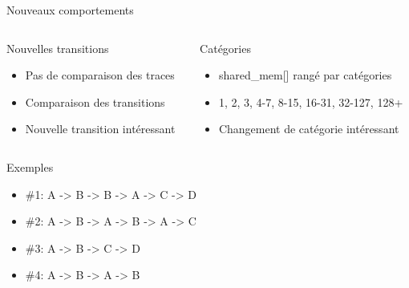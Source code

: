 \begin{frame}{Nouveaux comportements}
  \begin{columns}
    \begin{column}{0.5\textwidth}
      \begin{exampleblock}{Nouvelles transitions}
        \begin{itemize}
          \item{Pas de comparaison des traces}
          \item{Comparaison des transitions}
          \item{Nouvelle transition intéressant}
        \end{itemize}
      \end{exampleblock}
    \end{column}

    \begin{column}{0.5\textwidth}
      \begin{exampleblock}{Catégories}
        \begin{itemize}
          \item{shared\_mem[] rangé par catégories}
          \item{1, 2, 3, 4-7, 8-15, 16-31, 32-127, 128+} 
          \item{Changement de catégorie intéressant}
        \end{itemize}
      \end{exampleblock}
    \end{column}
  \end{columns}

  \pause
  \hspace{50.5cm}

  {\Large \centerline{Exemples}}

  \hspace{20.5cm}

  \begin{itemize}
    \item{\#1: A -> B -> B -> A -> C -> D} \pause
    \item{\#2: A -> B -> A -> B -> A -> C} \pause
    \item{\#3: A -> B -> C -> D} \pause
    \item{\#4: A -> B -> A -> B}
  \end{itemize}
\end{frame}

